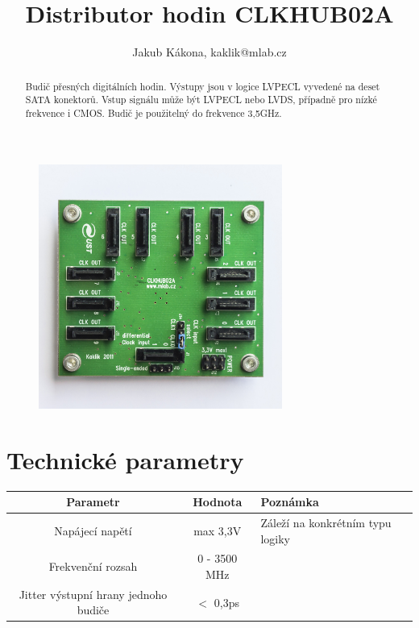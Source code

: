 \documentclass[12pt,a4paper,oneside]{article}
\begin{document}
\title{Distributor hodin CLKHUB02A}
\author{Jakub Kákona, kaklik@mlab.cz}
\maketitle

\thispagestyle{empty}
\begin{abstract}
Budič přesných digitálních hodin. Výstupy jsou v logice LVPECL vyvedené na deset SATA konektorů. Vstup signálu může být LVPECL nebo LVDS, případně pro nízké frekvence i CMOS. Budič je použitelný do frekvence 3,5GHz. 
\end{abstract}

\begin{figure} [htbp]
\begin{center}
\includegraphics [width=80mm] {CLKHUB02A_Top_Big.JPG} 
\end{center}
\end{figure}

\tableofcontents

\section{Technické parametry}
\begin{table}[htbp]
\begin{center}
\begin{tabular}{|c|c|p{4.7cm}|}
\hline
Parametr & Hodnota & Poznámka \\
\hline
Napájecí napětí & max 3,3V &  Záleží na konkrétním typu logiky \\ 
\hline
Frekvenční rozsah  & 0 - 3500 MHz &  \\ 
\hline
Jitter výstupní hrany jednoho budiče & $<$ 0,3ps &  \\ 
\hline
\end{tabular}
\end{center}
\end{table}
\end{document}
